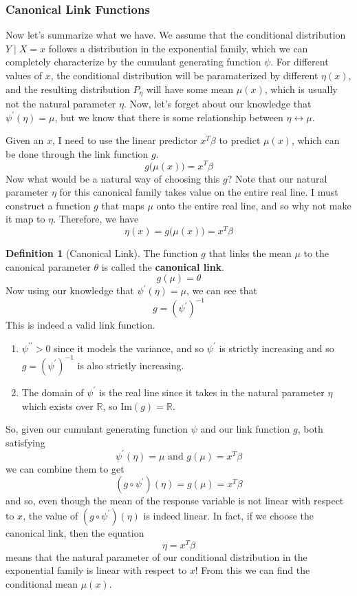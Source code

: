 \documentclass{article}
\theoremstyle{definition}
\newtheorem{definition}{Definition}[section]
\begin{document}
  \subsubsection{Canonical Link Functions}

  Now let's summarize what we have. We assume that the conditional distribution $Y \mid X = x$ follows a distribution in the exponential family, which we can completely characterize by the cumulant generating function $\psi$. For different values of $x$, the conditional distribution will be paramaterized by different $\eta (x)$, and the resulting distribution $P_\eta$ will have some mean $\mu(x)$, which is usually not the natural parameter $\eta$. Now, let's forget about our knowledge that $\psi^\prime(\eta) = \mu$, but we know that there is some relationship between $\eta \leftrightarrow \mu$.

  Given an $x$, I need to use the linear predictor $x^T \beta$ to predict $\mu(x)$, which can be done through the link function $g$. 
  \[g\big( \mu(x) \big) = x^T \beta\]
  Now what would be a natural way of choosing this $g$? Note that our natural parameter $\eta$ for this canonical family takes value on the entire real line. I must construct a function $g$ that maps $\mu$ onto the entire real line, and so why not make it map to $\eta$. Therefore, we have 
  \[\eta(x) = g\big( \mu(x) \big) = x^T \beta\]

  \begin{definition}[Canonical Link]
  The function $g$ that links the mean $\mu$ to the canonical parameter $\theta$ is called the \textbf{canonical link}. 
  \[g(\mu) = \theta\]
  Now using our knowledge that $\psi^\prime(\eta) = \mu$, we can see that 
  \[g = (\psi^\prime)^{-1}\]
  This is indeed a valid link function. 
  \begin{enumerate}
      \item $\psi^{\prime\prime} > 0$ since it models the variance, and so $\psi^\prime$ is strictly increasing and so $g = (\psi^\prime)^{-1}$ is also strictly increasing. 
      \item The domain of $\psi^\prime$ is the real line since it takes in the natural parameter $\eta$ which exists over $\mathbb{R}$, so $\mathrm{Im}(g) = \mathbb{R}$. 
  \end{enumerate}
  \end{definition}

  So, given our cumulant generating function $\psi$ and our link function $g$, both satisfying 
  \[\psi^\prime (\eta) = \mu \text{ and } g(\mu) = x^T \beta\]
  we can combine them to get 
  \[(g \circ \psi^\prime) (\eta) = g(\mu) = x^T \beta\]
  and so, even though the mean of the response variable is not linear with respect to $x$, the value of $(g \circ \psi^\prime) (\eta)$ is indeed linear. In fact, if we choose the canonical link, then the equation 
  \[\eta = x^T \beta\]
  means that the natural parameter of our conditional distribution in the exponential family is linear with respect to $x$! From this we can find the conditional mean $\mu(x)$. 
\end{document}
